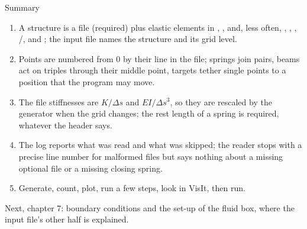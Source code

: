 \documentclass[aspectratio=169,11pt]{beamer}
\begin{document}
\begin{frame}{Summary}
\small
\begin{enumerate}
  \item A structure is a  file (required) plus elastic elements in , ,  and, less often, , , , /,  and ; the input file names the structure and its grid level.
  \item Points are numbered from 0 by their line in the  file; springs join pairs, beams act on triples through their middle point, targets tether single points to a position that the program may move.
  \item The file stiffnesses are $K/\Delta s$ and $EI/\Delta s^3$, so they are rescaled by the generator when the grid changes; the rest length of a spring is required, whatever the header says.
  \item The log reports what was read and what was skipped; the reader stops with a precise line number for malformed files but says nothing about a missing optional file or a missing closing spring.
  \item Generate, count, plot, run a few steps, look in VisIt, then run.
\end{enumerate}
\vspace{2mm}
\begin{homebox}
\small Next, chapter 7: boundary conditions and the set-up of the fluid box, where the input file's other half is explained.
\end{homebox}
\end{frame}
\end{document}
